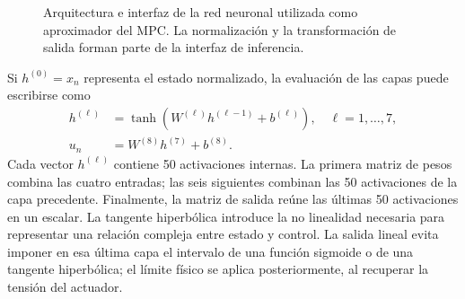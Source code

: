 \begin{figure}[H]
\centering
{}
\caption{Arquitectura e interfaz de la red neuronal utilizada como aproximador del MPC. La normalización y la transformación de salida forman parte de la interfaz de inferencia.}
\label{fig:arquitectura_mpc_cap2}
\end{figure}

Si $h^{(0)}=x_n$ representa el estado normalizado, la evaluación de las capas puede escribirse como
\begin{align}
h^{(\ell)} &= \tanh\!\left(W^{(\ell)}h^{(\ell-1)}+b^{(\ell)}\right),\quad \ell=1,\ldots,7,\\
u_n &= W^{(8)}h^{(7)}+b^{(8)}.
\end{align}
Cada vector $h^{(\ell)}$ contiene 50 activaciones internas. La primera matriz de pesos combina las cuatro entradas; las seis siguientes combinan las 50 activaciones de la capa precedente. Finalmente, la matriz de salida reúne las últimas 50 activaciones en un escalar. La tangente hiperbólica introduce la no linealidad necesaria para representar una relación compleja entre estado y control. La salida lineal evita imponer en esa última capa el intervalo de una función sigmoide o de una tangente hiperbólica; el límite físico se aplica posteriormente, al recuperar la tensión del actuador.

